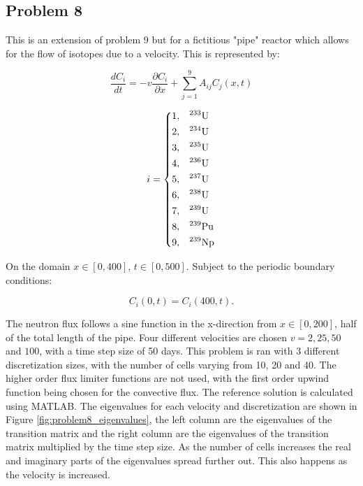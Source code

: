 \clearpage

\subsection{Problem 8}
This is an extension of problem 9 but for a fictitious "pipe" reactor which allows for the flow of isotopes due to a velocity. This is represented by:

\begin{equation}
\frac{d C_i}{dt} = -v\frac{\partial C_{i}}{\partial x} + \sum^9_{j = 1} A_{ij} C_j (x, t)
\end{equation}

\begin{equation}
i = \begin{dcases}
  1 , & \text{$^{233}$U}  \\
  2 , & \text{$^{234}$U}  \\
  3 , & \text{$^{235}$U}  \\
  4 , & \text{$^{236}$U}  \\
  5 , & \text{$^{237}$U}  \\
  6 , & \text{$^{238}$U}  \\
  7 , & \text{$^{239}$U}  \\
  8 , & \text{$^{239}$Pu} \\
  9 , & \text{$^{239}$Np} \\
\end{dcases}
\end{equation}

\noindent On the domain $x \in [0, 400]$, $t \in [0, 500]$. Subject to the periodic boundary conditions:

\begin{equation}
    C_{i}(0,t) = C_{i}(400,t).
\end{equation}

\noindent The neutron flux follows a sine function in the x-direction from $x \in [0, 200]$, half of the total length of the pipe. Four different velocities are chosen $ v = 2, 25, 50 $ and $100$, with a time step size of 50 days. This problem is ran with 3 different discretization sizes, with the number of cells varying from 10, 20 and 40. The higher order flux limiter functions are not used, with the first order upwind function being chosen for the convective flux. The reference solution is calculated using MATLAB. The eigenvalues for each velocity and discretization are shown in Figure \ref{fig:problem8_eigenvalues}, the left column are the eigenvalues of the transition matrix and the right column are the eigenvalues of the transition matrix multiplied by the time step size. As the number of cells increases the real and imaginary parts of the eigenvalues spread further out. This also happens as the velocity is increased. 

